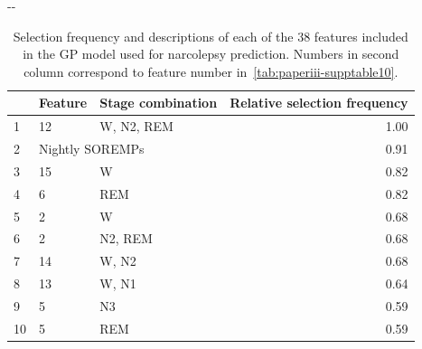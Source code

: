 \begin{table}[h]
    \begin{adjustwidth*}{}{-\marginparwidth-\marginparsep}
    \small
    \caption[Narcolepsy features selection frequencies]{Selection frequency and descriptions of each of the 38 features included in the \acl{GP} model used for narcolepsy prediction. Numbers in second column correspond to feature number in~\cref{tab:paperiii-supptable10}.}
    \label{tab:paperiii-supptable05}
    \begin{tabular}{@{}lp{4.5cm}lr@{}}
        \toprule
           & Feature                                                & Stage combination  & Relative selection frequency \\ \midrule
        1  & 12                                                     & \ac{W}, \ac{N2}, \ac{REM}             & 1.00                         \\
        2  & \multicolumn{2}{l}{Nightly \acp{SOREMP}}                                                       & 0.91                         \\
        3  & 15                                                     & \ac{W}                                & 0.82                         \\
        4  & 6                                                      & \ac{REM}                              & 0.82                         \\
        5  & 2                                                      & \ac{W}                                & 0.68                         \\
        6  & 2                                                      & \ac{N2}, \ac{REM}                     & 0.68                         \\
        7  & 14                                                     & \ac{W}, \ac{N2}                       & 0.68                         \\
        8  & 13                                                     & \ac{W}, \ac{N1}                       & 0.64                         \\
        9  & 5                                                      & \ac{N3}                               & 0.59                         \\
        10 & 5                                                      & \ac{REM}                              & 0.59                         \\

\end{tabular}
\end{adjustwidth*}
\end{table}
